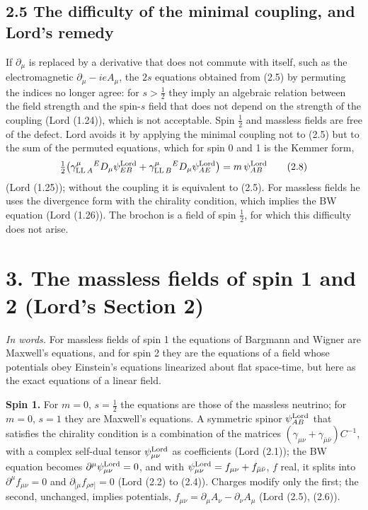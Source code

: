 \documentclass[
  10pt,
]{article}
\begin{document}
\hypertarget{the-difficulty-of-the-minimal-coupling-and-lords-remedy}{%
\subsection{2.5 The difficulty of the minimal coupling, and Lord's
remedy}\label{the-difficulty-of-the-minimal-coupling-and-lords-remedy}}

If \(\partial_\mu\) is replaced by a derivative that does not commute
with itself, such as the electromagnetic \(\partial_\mu-ieA_\mu\), the
\(2s\) equations obtained from (2.5) by permuting the indices no longer
agree: for \(s>\tfrac12\) they imply an algebraic relation between the
field strength and the spin-\(s\) field that does not depend on the
strength of the coupling (Lord (1.24)), which is not acceptable. Spin
\(\tfrac12\) and massless fields are free of the defect. Lord avoids it
by applying the minimal coupling not to (2.5) but to the sum of the
permuted equations, which for spin 0 and 1 is the Kemmer form,
\[\tfrac12\big(\gamma^{\mu}_{{\rm LL}\,A}{}^{E}D_\mu\psi^{\rm Lord}_{EB}+\gamma^{\mu}_{{\rm LL}\,B}{}^{E}D_\mu\psi^{\rm Lord}_{AE}\big)=m\,\psi^{\rm Lord}_{AB}\tag{2.8}\]
(Lord (1.25)); without the coupling it is equivalent to (2.5). For
massless fields he uses the divergence form with the chirality
condition, which implies the BW equation (Lord (1.26)). The brochon is a
field of spin \(\tfrac12\), for which this difficulty does not arise.

\hypertarget{the-massless-fields-of-spin-1-and-2-lords-section-2}{%
\section{3. The massless fields of spin 1 and 2 (Lord's Section
2)}\label{the-massless-fields-of-spin-1-and-2-lords-section-2}}

\emph{In words.} For massless fields of spin 1 the equations of Bargmann
and Wigner are Maxwell's equations, and for spin 2 they are the
equations of a field whose potentials obey Einstein's equations
linearized about flat space-time, but here as the exact equations of a
linear field.

\textbf{Spin 1.} For \(m=0\), \(s=\tfrac12\) the equations are those of
the massless neutrino; for \(m=0\), \(s=1\) they are Maxwell's
equations. A symmetric spinor \(\psi^{\rm Lord}_{AB}\) that satisfies
the chirality condition is a combination of the matrices
\((\gamma_{\mu\nu}+\gamma_{\bar\mu\bar\nu})C^{-1}\), with a complex
self-dual tensor \(\psi^{\rm Lord}_{\mu\nu}\) as coefficients (Lord
(2.1)); the BW equation becomes
\(\partial^\mu\psi^{\rm Lord}_{\mu\nu}=0\), and with
\(\psi^{\rm Lord}_{\mu\nu}=f_{\mu\nu}+f_{\bar\mu\bar\nu}\), \(f\) real,
it splits into \(\partial^\mu f_{\mu\nu}=0\) and
\(\partial_{[\mu}f_{\rho\sigma]}=0\) (Lord (2.2) to (2.4)). Charges
modify only the first; the second, unchanged, implies potentials,
\(f_{\mu\nu}=\partial_\mu A_\nu-\partial_\nu A_\mu\) (Lord (2.5),
(2.6)).
\end{document}
